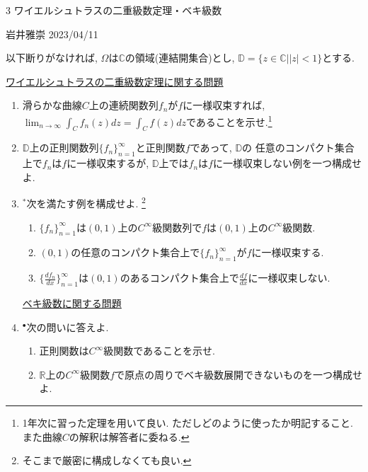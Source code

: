 \documentclass[dvipdfmx,a4paper,11pt]{article}
\newcommand{\R}{\mathbb{R}}
\newcommand{\C}{\mathbb{C}}
\newcommand{\D}{\mathbb{D}}
\theoremstyle{definition}
\newcommand{\drv}[2]{\frac{d #1}{d#2}}
\begin{document}
 \newpage


\begin{center}
{\Large 3 ワイエルシュトラスの二重級数定理・ベキ級数}
\end{center}

\begin{flushright}
 岩井雅崇 2023/04/11
\end{flushright}
以下断りがなければ, $\Omega$は$\C$の領域(連結開集合)とし, $\D= \{ z \in \C | |z|<1\}$とする. 

\vspace{12pt}
\hspace{-24pt}\underline{ワイエルシュトラスの二重級数定理に関する問題}

\begin{enumerate}[label=\textbf{問}3.\arabic*]

\item 滑らかな曲線$C$上の連続関数列$f_n$が$f$に一様収束すれば,
$\lim_{n\rightarrow \infty} \int_{C}f_n(z) dz = \int_{C} f(z) dz$であることを示せ.\footnote{1年次に習った定理を用いて良い. ただしどのように使ったか明記すること. また曲線$C$の解釈は解答者に委ねる. }
\item 
$\D$上の正則関数列$\{ f_{n}\}_{n=1}^{\infty}$と正則関数$f$であって, $\D$の
任意のコンパクト集合上で$f_n$は$f$に一様収束するが, $\D$上では$f_n$は$f$に一様収束しない例を一つ構成せよ. 


\item $^{*}$次を満たす例を構成せよ. \footnote{そこまで厳密に構成しなくても良い.}
 \begin{enumerate}
\setlength{\parskip}{0cm} 
  \setlength{\itemsep}{0cm} 
\item $\{ f_{n}\}_{n=1}^{\infty}$は$(0,1)$上の$C^{\infty}$級関数列で$f$は$(0,1)$上の$C^{\infty}$級関数.
\item $(0,1)$の任意のコンパクト集合上で$\{ f_{n}\}_{n=1}^{\infty}$が$f$に一様収束する.
\item $\{ \drv{f_{n}}{x}\}_{n=1}^{\infty}$は$(0,1)$のあるコンパクト集合上で$\drv{f}{x}$に一様収束しない.
\end{enumerate}

 \vspace{12pt}
\hspace{-36pt}\underline{ベキ級数に関する問題}

\item $^{\bullet}$次の問いに答えよ.
 \begin{enumerate}
\setlength{\parskip}{0cm} 
  \setlength{\itemsep}{0cm} 
\item 正則関数は$C^{\infty}$級関数であることを示せ.
\item $\R$上の$C^{\infty}$級関数$f$で原点の周りでベキ級数展開できないものを一つ構成せよ. 
\end{enumerate}


\end{enumerate}
\end{document}

